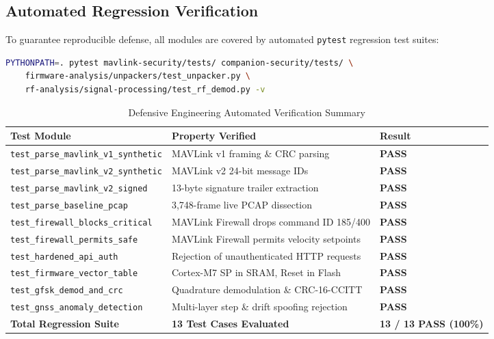 \documentclass[11pt,a4paper]{article}
\begin{document}
\subsection{Automated Regression Verification}
To guarantee reproducible defense, all modules are covered by automated \texttt{pytest} regression test suites:
\begin{lstlisting}[language=bash]
PYTHONPATH=. pytest mavlink-security/tests/ companion-security/tests/ \
    firmware-analysis/unpackers/test_unpacker.py \
    rf-analysis/signal-processing/test_rf_demod.py -v
\end{lstlisting}
\begin{table}[htbp]
    \centering
    \small
    \begin{tabular}{lll}
        \toprule
        \textbf{Test Module} & \textbf{Property Verified} & \textbf{Result} \\
        \midrule
        \texttt{test\_parse\_mavlink\_v1\_synthetic} & MAVLink v1 framing \& CRC parsing & \textbf{PASS} \\
        \texttt{test\_parse\_mavlink\_v2\_synthetic} & MAVLink v2 24-bit message IDs & \textbf{PASS} \\
        \texttt{test\_parse\_mavlink\_v2\_signed} & 13-byte signature trailer extraction & \textbf{PASS} \\
        \texttt{test\_parse\_baseline\_pcap} & 3,748-frame live PCAP dissection & \textbf{PASS} \\
        \texttt{test\_firewall\_blocks\_critical} & MAVLink Firewall drops command ID 185/400 & \textbf{PASS} \\
        \texttt{test\_firewall\_permits\_safe} & MAVLink Firewall permits velocity setpoints & \textbf{PASS} \\
        \texttt{test\_hardened\_api\_auth} & Rejection of unauthenticated HTTP requests & \textbf{PASS} \\
        \texttt{test\_firmware\_vector\_table} & Cortex-M7 SP in SRAM, Reset in Flash & \textbf{PASS} \\
        \texttt{test\_gfsk\_demod\_and\_crc} & Quadrature demodulation \& CRC-16-CCITT & \textbf{PASS} \\
        \texttt{test\_gnss\_anomaly\_detection} & Multi-layer step \& drift spoofing rejection & \textbf{PASS} \\
        \midrule
        \textbf{Total Regression Suite} & \textbf{13 Test Cases Evaluated} & \textbf{13 / 13 PASS (100\%)} \\
        \bottomrule
    \end{tabular}
    \caption{Defensive Engineering Automated Verification Summary}
    \label{tab:tests}
\end{table}
\end{document}

